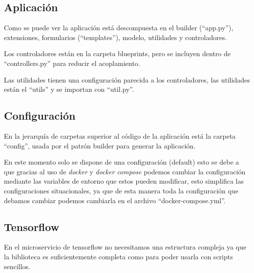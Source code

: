 \subsection{Aplicación}
Como se puede ver la aplicación está descompuesta en el builder (``app.py''), extensiones, formularios (``templates''), modelo, utilidades y controladores.

Los controladores están en la carpeta blueprints, pero se incluyen dentro de ``controllers.py'' para reducir el acoplamiento.

Las utilidades tienen una configuración parecida a los controladores, las utilidades están el ``utils'' y se importan con ``util.py''.


\subsection{Configuración}
En la jerarquía de carpetas superior al código de la aplicación está la carpeta ``config'', usada por el patrón builder para generar la aplicación.

En este momento solo se dispone de una configuración (default) esto se debe a que gracias al uso de \emph{docker} y \emph{docker compose} podemos cambiar la configuración mediante las variables de entorno que estos pueden modificar, esto simplifica las configuraciones situacionales, ya que de esta manera toda la configuración que debamos cambiar podemos cambiarla en el archivo ``docker-compose.yml''.

\subsection{Tensorflow}
En el microservicio de tensorflow no necesitamos una estructura compleja ya que la biblioteca es suficientemente completa como para poder usarla con scripts sencillos.






